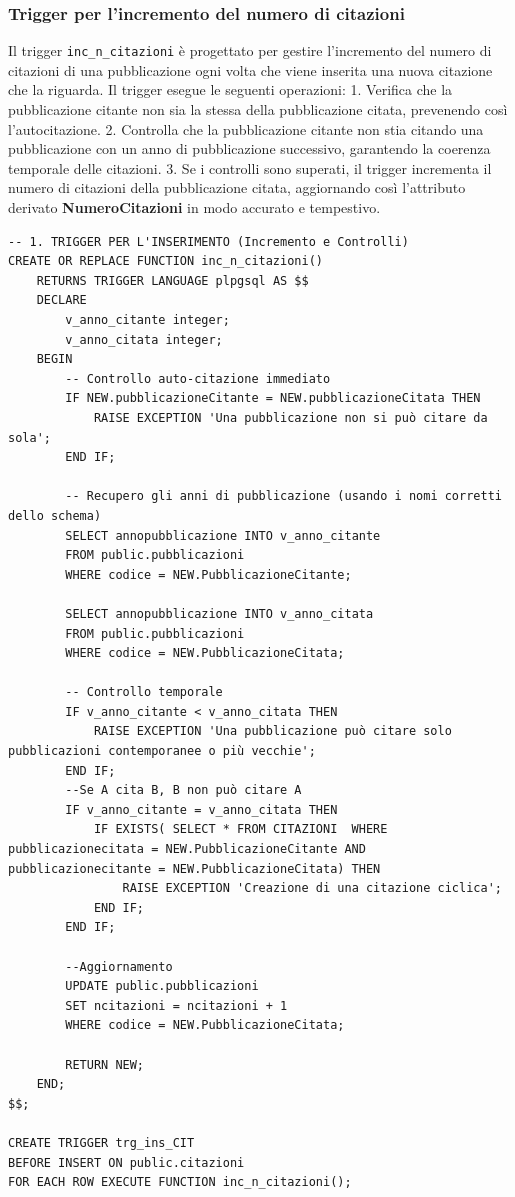 \documentclass[a4paper,12pt]{article}
\begin{document}
\subsubsection{Trigger per l'incremento del numero di citazioni}
Il trigger \texttt{inc\_n\_citazioni} è progettato per gestire l'incremento del numero di citazioni di una pubblicazione ogni volta che viene inserita una nuova citazione che la riguarda. Il trigger esegue le seguenti operazioni:
1. Verifica che la pubblicazione citante non sia la stessa della pubblicazione citata, prevenendo così l'autocitazione.
2. Controlla che la pubblicazione citante non stia citando una pubblicazione
con un anno di pubblicazione successivo, garantendo la coerenza temporale delle citazioni.
3. Se i controlli sono superati, il trigger incrementa il numero di citazioni
della pubblicazione citata, aggiornando così l'attributo derivato \textbf{NumeroCitazioni} in modo accurato e tempestivo.\\
\begin{lstlisting}
-- 1. TRIGGER PER L'INSERIMENTO (Incremento e Controlli)
CREATE OR REPLACE FUNCTION inc_n_citazioni()
    RETURNS TRIGGER LANGUAGE plpgsql AS $$
    DECLARE
        v_anno_citante integer;
        v_anno_citata integer;
    BEGIN
        -- Controllo auto-citazione immediato
        IF NEW.pubblicazioneCitante = NEW.pubblicazioneCitata THEN
            RAISE EXCEPTION 'Una pubblicazione non si può citare da sola';
        END IF;

        -- Recupero gli anni di pubblicazione (usando i nomi corretti dello schema)
        SELECT annopubblicazione INTO v_anno_citante 
        FROM public.pubblicazioni 
        WHERE codice = NEW.PubblicazioneCitante;

        SELECT annopubblicazione INTO v_anno_citata 
        FROM public.pubblicazioni 
        WHERE codice = NEW.PubblicazioneCitata;

        -- Controllo temporale
        IF v_anno_citante < v_anno_citata THEN
            RAISE EXCEPTION 'Una pubblicazione può citare solo pubblicazioni contemporanee o più vecchie';
        END IF;
		--Se A cita B, B non può citare A
        IF v_anno_citante = v_anno_citata THEN
			IF EXISTS( SELECT *	FROM CITAZIONI	WHERE pubblicazionecitata = NEW.PubblicazioneCitante AND pubblicazionecitante = NEW.PubblicazioneCitata) THEN
				RAISE EXCEPTION 'Creazione di una citazione ciclica';
			END IF;
		END IF;

		--Aggiornamento
        UPDATE public.pubblicazioni
        SET ncitazioni = ncitazioni + 1
        WHERE codice = NEW.PubblicazioneCitata;

        RETURN NEW;
    END;
$$;

CREATE TRIGGER trg_ins_CIT
BEFORE INSERT ON public.citazioni
FOR EACH ROW EXECUTE FUNCTION inc_n_citazioni();

\end{lstlisting}
\end{document}
